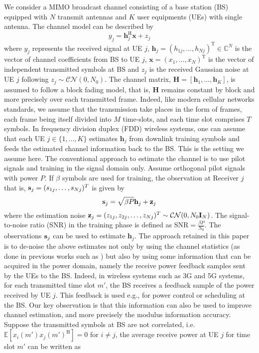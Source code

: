 \documentclass[francais]{gretsi}
\begin{document}
We consider a MIMO broadcast channel consisting of a base station (BS) equipped with $N$  transmit antennas and $K$ user equipments (UEs) with single antenna. The channel model can be described by 
\begin{equation}
y_j = \mathbf{h}_{j}^{\mathrm{H}} \mathbf{x} + z_j
\end{equation}
where $y_j$ represents the received signal at UE $j$,  $\mathbf{h}_j=(h_{1j},\dots,h_{Nj})^{\mathrm{T}}\in \mathbb{C}^N$ is the vector of channel coefficients from BS to UE $j$, $\mathbf{x}=(x_1,\dots,x_N)^{\mathrm{T}}$ is the vector of independent transmitted symbols at BS and $z_j$ is the received Gaussian noise at UE $j$ following $z_j\sim \mathcal{CN}(0,N_0)$. The channel matrix, $\mathbf{H}=[\mathbf{h}_1,\dots,\mathbf{h}_K]$, is assumed to follow a block fading model, that is, $\mathbf{H}$ remains constant by block and more precisely over each transmitted frame. Indeed, like modern cellular networks standards, we assume that the transmission take places in the form of frames, each frame being itself divided into $M$ time-slots, and each time slot comprises $T$ symbols. In frequency division duplex (FDD) wireless systems, one can assume that  each UE $j\in\{1,\dots,K\}$ estimates $\mathbf{h}_{j}$ from downlink training symbols and feeds the estimated channel information back to the BS. This is the setting we assume here. The conventional approach to estimate the channel is to use pilot signals and training in the signal domain only. Assume orthogonal pilot signals with power $P$. If $\beta$ symbols are used for training, the observation at Receiver $j$ that is, $\bold{s}_j=(s_{1j},\dots,s_{Nj})^T$ is given by
\begin{equation}
\bold{s}_j = \sqrt{\beta P} \mathbf{h}_j  + \bold{z}_j
\end{equation}
where the estimation noise $\bold{z}_j=(z_{1j},z_{2j},\dots,z_{Nj})^T\sim \mathcal{CN}(0,N_0\bold{I}_N)$.  The signal-to-noise ratio (SNR) in the training phase is defined as $\mathrm{SNR}=\frac{\beta P}{N_0}$. The observations $\bold{s}_j$ can be used to estimate $\mathbf{h}_j$. The approach retained in this paper is to de-noise the above estimates not only by using the channel statistics (as done in previous works such as \cite{lasaulce-vtc-2001}) but also by using some information that can be acquired in the power domain, namely the receive power feedback samples sent by the UEs to the BS. Indeed, in wireless systems such as 3G and 5G systems, for each transmitted time slot $m'$, the BS receives a feedback sample of the power received by UE $j$. This feedback is used e.g., for power control or scheduling at the BS. Our key observation is that this information can also be used to improve channel estimation, and more precisely the modulus information accuracy. Suppose the transmitted symbols at BS are not correlated, i.e. $\mathbb{E}[x_i(m')x_j(m')^{\mathrm{H}}]=0$ for $i\neq j$, the average receive power at UE $j$ for time slot $m'$ can be written as
\end{document}
